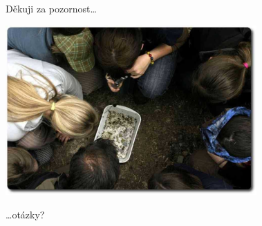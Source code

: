 \documentclass[compress,xelatex,xcolor=dvipsnames,print]{beamer}
\begin{document}
\begin{frame}{Děkuji za pozornost\ldots}
\begin{center}
\includegraphics[height=6.5cm]{zaver.jpg}
\end{center}
\begin{flushright}
\begin{large}\ldots otázky?\end{large}
\end{flushright}
\end{frame}
\end{document}
